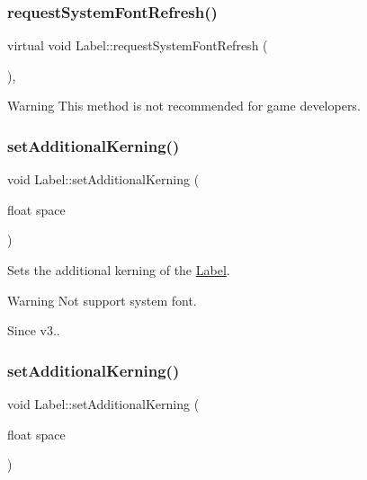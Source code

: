 \subsubsection{\texorpdfstring{request\+System\+Font\+Refresh()}{requestSystemFontRefresh()}\hspace{0.1cm}{\footnotesize\ttfamily [2/2]}}
{\footnotesize\ttfamily virtual void Label\+::request\+System\+Font\+Refresh (\begin{DoxyParamCaption}{ }\end{DoxyParamCaption})\hspace{0.3cm}{\ttfamily [inline]}, {\ttfamily [virtual]}}

\begin{DoxyWarning}{Warning}
This method is not recommended for game developers. 
\end{DoxyWarning}
\mbox{\label{classLabel_aef8a7f1ece5bb313fce798b1538640d7}} 
\subsubsection{\texorpdfstring{set\+Additional\+Kerning()}{setAdditionalKerning()}\hspace{0.1cm}{\footnotesize\ttfamily [1/2]}}
{\footnotesize\ttfamily void Label\+::set\+Additional\+Kerning (\begin{DoxyParamCaption}\item[{float}]{space }\end{DoxyParamCaption})}

Sets the additional kerning of the \hyperlink{classLabel}{Label}.

\begin{DoxyWarning}{Warning}
Not support system font. 
\end{DoxyWarning}
\begin{DoxySince}{Since}
v3.. 
\end{DoxySince}
\mbox{\label{classLabel_aef8a7f1ece5bb313fce798b1538640d7}} 
\subsubsection{\texorpdfstring{set\+Additional\+Kerning()}{setAdditionalKerning()}\hspace{0.1cm}{\footnotesize\ttfamily [2/2]}}
{\footnotesize\ttfamily void Label\+::set\+Additional\+Kerning (\begin{DoxyParamCaption}\item[{float}]{space }\end{DoxyParamCaption})}

